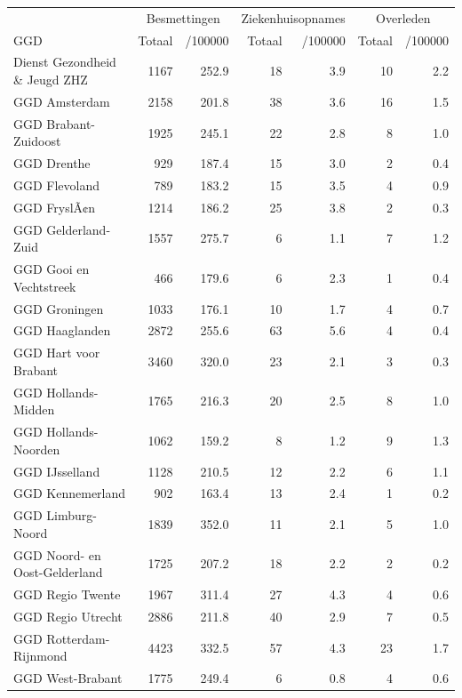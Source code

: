 \documentclass[
  english,
  man,floatsintext]{apa6}
\begin{document}
\begin{table}
\centering\begingroup\fontsize{10}{12}\selectfont

\begin{threeparttable}
\begin{tabular}{lrrrrrr}
\toprule
\multicolumn{1}{c}{ } & \multicolumn{2}{c}{Besmettingen} & \multicolumn{2}{c}{Ziekenhuisopnames} & \multicolumn{2}{c}{Overleden} \\
\cmidrule(l{3pt}r{3pt}){2-3} \cmidrule(l{3pt}r{3pt}){4-5} \cmidrule(l{3pt}r{3pt}){6-7}
GGD & Totaal & /100000 & Totaal & /100000 & Totaal & /100000\\
\midrule
Dienst Gezondheid \& Jeugd ZHZ & 1167 & 252.9 & 18 & 3.9 & 10 & 2.2\\
GGD Amsterdam & 2158 & 201.8 & 38 & 3.6 & 16 & 1.5\\
GGD Brabant-Zuidoost & 1925 & 245.1 & 22 & 2.8 & 8 & 1.0\\
GGD Drenthe & 929 & 187.4 & 15 & 3.0 & 2 & 0.4\\
GGD Flevoland & 789 & 183.2 & 15 & 3.5 & 4 & 0.9\\
GGD FryslÃ¢n & 1214 & 186.2 & 25 & 3.8 & 2 & 0.3\\
GGD Gelderland-Zuid & 1557 & 275.7 & 6 & 1.1 & 7 & 1.2\\
GGD Gooi en Vechtstreek & 466 & 179.6 & 6 & 2.3 & 1 & 0.4\\
GGD Groningen & 1033 & 176.1 & 10 & 1.7 & 4 & 0.7\\
GGD Haaglanden & 2872 & 255.6 & 63 & 5.6 & 4 & 0.4\\
GGD Hart voor Brabant & 3460 & 320.0 & 23 & 2.1 & 3 & 0.3\\
GGD Hollands-Midden & 1765 & 216.3 & 20 & 2.5 & 8 & 1.0\\
GGD Hollands-Noorden & 1062 & 159.2 & 8 & 1.2 & 9 & 1.3\\
GGD IJsselland & 1128 & 210.5 & 12 & 2.2 & 6 & 1.1\\
GGD Kennemerland & 902 & 163.4 & 13 & 2.4 & 1 & 0.2\\
GGD Limburg-Noord & 1839 & 352.0 & 11 & 2.1 & 5 & 1.0\\
GGD Noord- en Oost-Gelderland & 1725 & 207.2 & 18 & 2.2 & 2 & 0.2\\
GGD Regio Twente & 1967 & 311.4 & 27 & 4.3 & 4 & 0.6\\
GGD Regio Utrecht & 2886 & 211.8 & 40 & 2.9 & 7 & 0.5\\
GGD Rotterdam-Rijnmond & 4423 & 332.5 & 57 & 4.3 & 23 & 1.7\\
GGD West-Brabant & 1775 & 249.4 & 6 & 0.8 & 4 & 0.6\\

\end{tabular}
\end{threeparttable}
\end{table}
\end{document}
